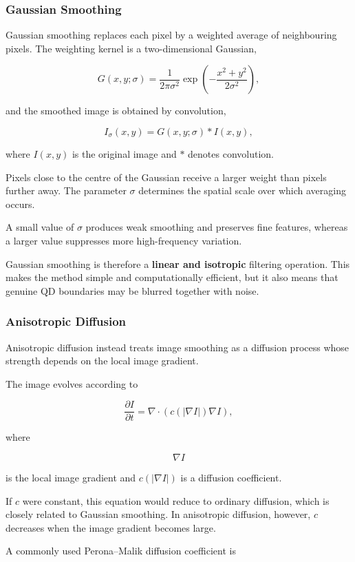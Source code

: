 \documentclass[11pt,a4paper]{article}
\begin{document}
\subsubsection{Gaussian Smoothing}

Gaussian smoothing replaces each pixel by a weighted average of neighbouring pixels. The weighting kernel is a two-dimensional Gaussian,

\[
G(x,y;\sigma)
=
\frac{1}{2\pi\sigma^2}
\exp\left(
-\frac{x^2+y^2}{2\sigma^2}
\right),
\]

and the smoothed image is obtained by convolution,

\[
I_{\sigma}(x,y)
=
G(x,y;\sigma) * I(x,y),
\]

where \(I(x,y)\) is the original image and \(*\) denotes convolution.

Pixels close to the centre of the Gaussian receive a larger weight than pixels further away. The parameter \(\sigma\) determines the spatial scale over which averaging occurs.

A small value of \(\sigma\) produces weak smoothing and preserves fine features, whereas a larger value suppresses more high-frequency variation.

Gaussian smoothing is therefore a \textbf{linear and isotropic} filtering operation. This makes the method simple and computationally efficient, but it also means that genuine QD boundaries may be blurred together with noise.

\subsubsection{Anisotropic Diffusion}

Anisotropic diffusion instead treats image smoothing as a diffusion process whose strength depends on the local image gradient.

The image evolves according to

\[
\frac{\partial I}{\partial t}
=
\nabla \cdot
\left(
c(|\nabla I|)\nabla I
\right),
\]

where

\[
\nabla I
\]

is the local image gradient and \(c(|\nabla I|)\) is a diffusion coefficient.

If \(c\) were constant, this equation would reduce to ordinary diffusion, which is closely related to Gaussian smoothing. In anisotropic diffusion, however, \(c\) decreases when the image gradient becomes large.

A commonly used Perona--Malik diffusion coefficient is
\end{document}
